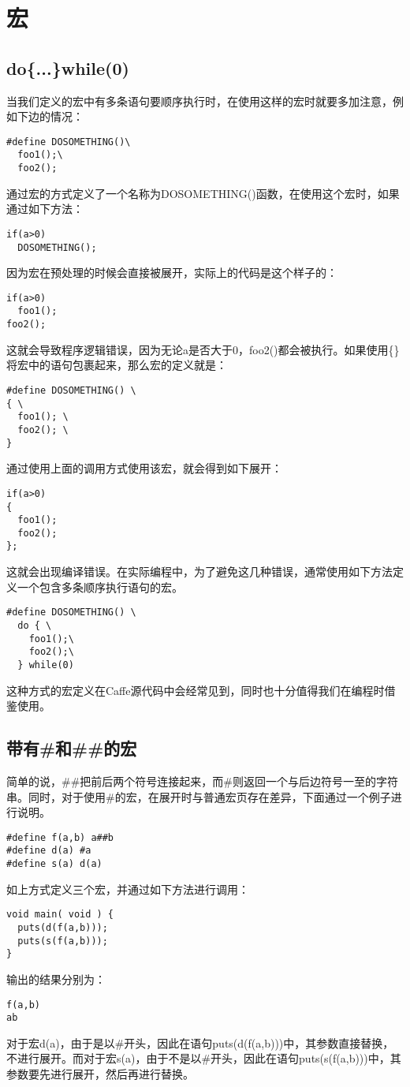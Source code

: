 \section{宏}
\subsection{do\{...\}while(0)}\label{c/macro/dowhile}
当我们定义的宏中有多条语句要顺序执行时，在使用这样的宏时就要多加注意，例如下边的情况：
\begin{verbatim}
#define DOSOMETHING()\
  foo1();\
  foo2();
\end{verbatim}
通过宏的方式定义了一个名称为DOSOMETHING()函数，在使用这个宏时，如果通过如下方法：
\begin{verbatim}
if(a>0)
  DOSOMETHING();
\end{verbatim}
因为宏在预处理的时候会直接被展开，实际上的代码是这个样子的：
\begin{verbatim}
if(a>0)
  foo1();
foo2();
\end{verbatim}
这就会导致程序逻辑错误，因为无论a是否大于0，foo2()都会被执行。如果使用\{\}将宏中的语句包裹起来，那么宏的定义就是：
\begin{verbatim}
#define DOSOMETHING() \
{ \
  foo1(); \
  foo2(); \
}
\end{verbatim}
通过使用上面的调用方式使用该宏，就会得到如下展开：
\begin{verbatim}
if(a>0)
{
  foo1();
  foo2();
};
\end{verbatim}
这就会出现编译错误。在实际编程中，为了避免这几种错误，通常使用如下方法定义一个包含多条顺序执行语句的宏。
\begin{verbatim}
#define DOSOMETHING() \
  do { \
    foo1();\
    foo2();\
  } while(0)
\end{verbatim}
这种方式的宏定义在Caffe源代码中会经常见到，同时也十分值得我们在编程时借鉴使用。
\subsection{带有\#和\#\#的宏}\label{c/macro/sharp}
简单的说，\#\#把前后两个符号连接起来，而\#则返回一个与后边符号一至的字符串。同时，对于使用\#的宏，在展开时与普通宏页存在差异，下面通过一个例子进行说明。
\begin{verbatim}
#define f(a,b) a##b
#define d(a) #a
#define s(a) d(a) 
\end{verbatim}
如上方式定义三个宏，并通过如下方法进行调用：
\begin{verbatim}
void main( void ) {
  puts(d(f(a,b)));
  puts(s(f(a,b)));
} 
\end{verbatim}
输出的结果分别为：
\begin{verbatim}
f(a,b)
ab
\end{verbatim}
对于宏d(a)，由于是以\#开头，因此在语句puts(d(f(a,b)))中，其参数直接替换，不进行展开。而对于宏s(a)，由于不是以\#开头，因此在语句puts(s(f(a,b)))中，其参数要先进行展开，然后再进行替换。
